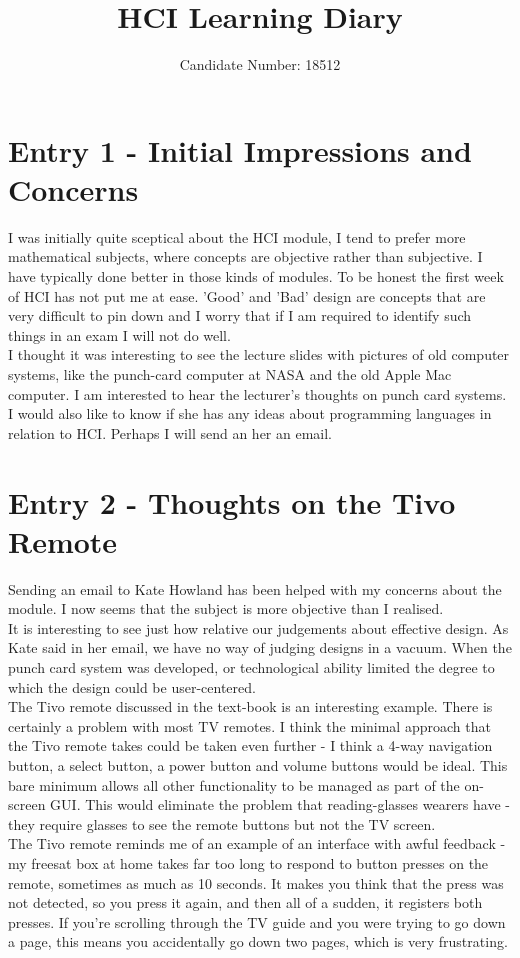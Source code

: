 \documentclass{article}
\title{HCI Learning Diary}
\author{Candidate Number: 18512}
\begin{document}
\maketitle
\section*{Entry 1 - Initial Impressions and Concerns}

\noindent I was initially quite sceptical about the HCI module, I tend to prefer more mathematical subjects, where concepts are objective rather than subjective. I have typically done better in those kinds of modules. To be honest the first week of HCI has not put me at ease. 'Good' and 'Bad' design are concepts that are very difficult to pin down and I worry that if I am required to identify such things in an exam I will not do well.
\\\indent I thought it was interesting to see the lecture slides with pictures of old computer systems, like the punch-card computer at NASA and the old Apple Mac computer. I am interested to hear the lecturer's thoughts on punch card systems. I would also like to know if she has any ideas about programming languages in relation to HCI. Perhaps I will send an her an email.

\section*{Entry 2 - Thoughts on the Tivo Remote}

\noindent Sending an email to Kate Howland has been helped with my concerns about the module. I now seems that the subject is more objective than I realised.
\\\indent It is interesting to see just how relative our judgements about effective design. As Kate said in her email, we have no way of judging designs in a vacuum. When the punch card system was developed, or technological ability limited the degree to which the design could be user-centered.
\\\indent The Tivo remote discussed in the text-book is an interesting example. There is certainly a problem with most TV remotes. I think the minimal approach that the Tivo remote takes could be taken even further - I think a 4-way navigation button, a select button, a power button and volume buttons would be ideal. This bare minimum allows all other functionality to be managed as part of the on-screen GUI. This would eliminate the problem that reading-glasses wearers have - they require glasses to see the remote buttons but not the TV screen.
\\\indent The Tivo remote reminds me of an example of an interface with awful feedback - my freesat box at home takes far too long to respond to button presses on the remote, sometimes as much as 10 seconds. It makes you think that the press was not detected, so you press it again, and then all of a sudden, it registers both presses. If you're scrolling through the TV guide and you were trying to go down a page, this means you accidentally go down two pages, which is very frustrating.
\end{document}

